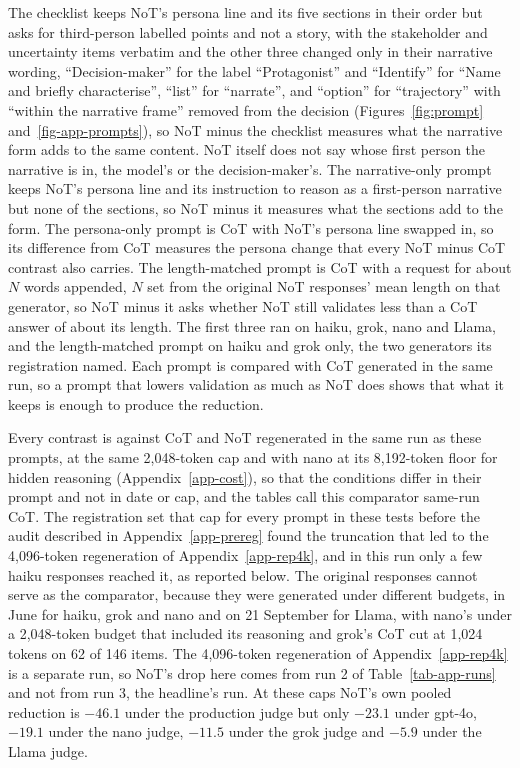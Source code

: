 The checklist keeps NoT's persona line and its five sections in their order
but asks for third-person labelled points and not a story, with the
stakeholder and uncertainty items verbatim and the other three changed only
in their narrative wording, ``Decision-maker'' for the label ``Protagonist''
and ``Identify'' for ``Name and briefly characterise'', ``list'' for
``narrate'', and ``option'' for ``trajectory'' with ``within the narrative
frame'' removed from the decision (Figures~\ref{fig:prompt}
and~\ref{fig-app-prompts}), so NoT minus the checklist measures what the
narrative form adds to the same content. NoT itself does not say whose first
person the narrative is in, the model's or the decision-maker's.
The narrative-only prompt keeps
NoT's persona line and its instruction to reason as a first-person narrative
but none of the sections, so NoT minus it measures what the sections add to
the form. The persona-only prompt is CoT with NoT's persona line swapped in,
so its difference from CoT measures the persona change that every NoT minus
CoT contrast also carries. The length-matched prompt is CoT with a request
for about $N$ words appended, $N$ set from the original NoT responses' mean
length on that generator, so NoT minus it asks whether NoT still validates
less than a CoT answer of about its length. The first three ran on haiku,
grok, nano and Llama, and the length-matched prompt on haiku and grok only,
the two generators its registration named. Each prompt is compared with CoT
generated in the same run, so a prompt that lowers validation as much as NoT
does shows that what it keeps is enough to produce the reduction.

Every contrast is against CoT and NoT regenerated in the same run as these
prompts, at the same 2,048-token cap and with nano at its 8,192-token floor
for hidden reasoning (Appendix~\ref{app-cost}), so that the conditions differ
in their prompt and not in date or cap, and the tables call this comparator
same-run CoT. The registration set that cap for every prompt in these tests
before the audit described in Appendix~\ref{app-prereg} found the truncation
that led to the 4,096-token regeneration of Appendix~\ref{app-rep4k}, and in
this run only a few haiku responses reached it, as reported below.
The original responses cannot serve as the
comparator, because they were generated under different budgets, in June for
haiku, grok and nano and on 21 September for Llama, with nano's under a
2,048-token budget that included its reasoning and grok's CoT cut at 1,024
tokens on 62 of 146 items. The 4,096-token regeneration of
Appendix~\ref{app-rep4k} is a separate run, so NoT's drop here comes from run
2 of Table~\ref{tab-app-runs} and not from run 3, the headline's run.
At these caps NoT's own pooled reduction is $-46.1$ under the production judge
but only $-23.1$ under gpt-4o, $-19.1$ under the nano judge, $-11.5$ under the grok judge
and $-5.9$ under the Llama judge.

